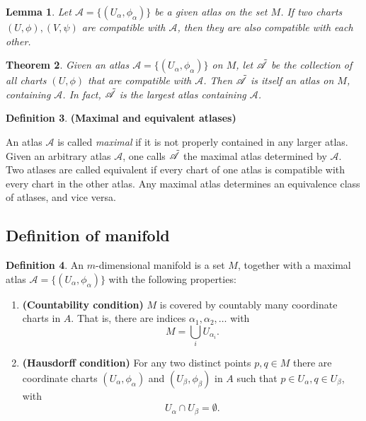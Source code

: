 \documentclass{article}
\newtheorem{theorem}{Theorem}[section]
\newtheorem{lemma}[theorem]{Lemma}
\theoremstyle{definition}
\newtheorem{defn}[theorem]{Definition}
\newenvironment{definition}
  {\vspace{8pt}\begin{mdframed}[backgroundcolor=blueish]\begin{defn}}
  {\end{defn}\end{mdframed}\vspace{4pt}}
\begin{document}
\begin{lemma}

Let $\mathscr{A} =  \{(U_\alpha, \phi_\alpha) \}$ be a given atlas on the set $M$. If two charts $(U,\phi), (V,\psi)$ are compatible with $\mathscr{A}$, then they are also compatible with each other.
\end{lemma}

\begin{theorem}

Given an atlas $\mathscr{A} =  \{(U_\alpha, \phi_\alpha) \}$ on $M$, let $\Tilde{\mathscr{A}}$ be the collection of all charts $(U,\phi)$ that are compatible with $\mathscr{A}$. Then $\Tilde{\mathscr{A}}$ is itself an atlas on $M$, containing $\mathscr{A}$. In fact, $\Tilde{\mathscr{A}}$ is the largest atlas containing $\mathscr{A}$.
\end{theorem}

\begin{definition} \textbf{(Maximal and equivalent atlases)}

An atlas $\mathscr{A}$ is called \textit{maximal} if it is not properly contained in any larger atlas. Given an arbitrary atlas $\mathscr{A}$, one calls $\Tilde{\mathscr{A}}$ the maximal
atlas determined by $\mathscr{A}$.  Two atlases are called equivalent if every chart of one atlas is compatible with every chart in the other atlas. Any maximal atlas determines an equivalence class of atlases, and vice versa.
\end{definition}


\subsection{Definition of manifold}

\begin{definition}
An $m$-dimensional manifold is a set $M$, together with a maximal atlas $\mathscr{A} =  \{(U_\alpha, \phi_\alpha) \}$ with the following properties: 
\begin{enumerate}
    \item \textbf{(Countability condition)} $M$ is covered by countably many coordinate charts in $A$. That is, there are indices $\alpha_1, \alpha_2, \dots$ with
    \[
        M = \bigcup_i U_{\alpha_i}.
    \]
    \item \textbf{(Hausdorff condition)} For any two distinct points $p,q \in M$ there are coordinate charts $(U_\alpha, \phi_\alpha)$ and $(U_\beta, \phi_\beta)$ in $A$ such that $p \in U_\alpha, q \in U_\beta$, with
    \[
        U_\alpha \cap U_\beta = \emptyset.
    \]
\end{enumerate}
\end{definition}
\end{document}
